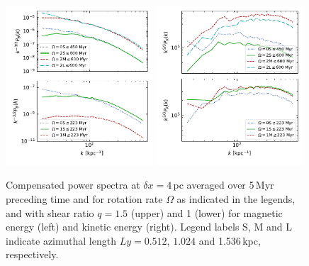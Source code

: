 \documentclass[iop,apj,numberedappendix,twocolappendix]{emulateapj}
\newcommand{\dx}{\delta x}
\begin{document}
\begin{figure}
\centering
\includegraphics[trim=0.0cm 0.0cm 0.0cm 0.0cm,clip=true,width=0.49\textwidth]{csc_figs/B1O1qMBpower.pdf}
\includegraphics[trim=0.0cm 0.0cm 0.0cm 0.0cm,clip=true,width=0.49\textwidth]{csc_figs/B1O1qMkpower.pdf}
\caption{
Compensated power spectra at $\dx=4$\,pc averaged over 5\,Myr preceding time
and for rotation rate $\Omega$ as indicated in the legends, and with 
shear ratio $q=1.5$ (upper) and 1 (lower) for magnetic energy (left) and
kinetic energy (right).
Legend labels S, M and L indicate azimuthal length $Ly=0.512,\,1.024$ and 
1.536\,kpc, respectively. 
\label{fig:lsd-power}
}
\end{figure}
\end{document}

